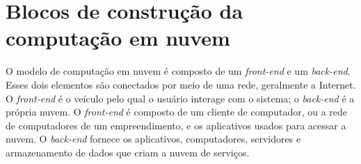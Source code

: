 \section{Blocos de construção da computação em nuvem}

\newcommand{\frontend}{\emph{front-end}\xspace}
\newcommand{\backend} {\emph{back-end}\xspace}

O modelo de computação em nuvem é composto de um \frontend e um \backend. Esses dois
elementos são conectados por meio de uma rede, geralmente a Internet. O \frontend é
o veículo pelo qual o usuário interage com o sistema; o \backend é a própria nuvem.
O \frontend é composto de um cliente de computador, ou a rede de computadores de um
empreendimento, e os aplicativos usados para acessar a nuvem. O \backend fornece os
aplicativos, computadores, servidores e armazenamento de dados que criam a nuvem de
serviços. 
